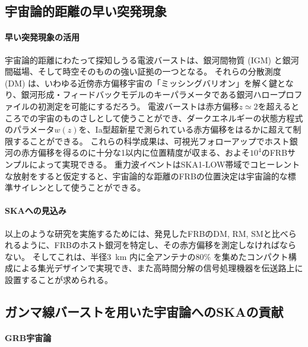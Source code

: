 \subsection{宇宙論的距離の早い突発現象}
\label{c09.s2.ss5}

\paragraph{早い突発現象の活用}

宇宙論的距離にわたって探知しうる電波バーストは、銀河間物質 (IGM) と銀河間磁場、そして時空そのものの強い証拠の一つとなる。
それらの分散測度 (DM) は、いわゆる近傍赤方偏移宇宙の「ミッシングバリオン」を解く鍵となり、銀河形成・フィードバックモデルのキーパラメータである銀河ハロープロファイルの初測定を可能にするだろう。
電波バーストは赤方偏移$z\simeq 2$を超えるところでの宇宙のものさしとして使うことができ、ダークエネルギーの状態方程式のパラメータ$w(z)$を、Ia型超新星で測られている赤方偏移をはるかに超えて制限することができる。
これらの科学成果は、可視光フォローアップでホスト銀河の赤方偏移を得るのに十分な1\arcsec 以内に位置精度が収まる、およそ$10^4$のFRBサンプルによって実現できる。
重力波イベントはSKA1-LOW帯域でコヒーレントな放射をすると仮定すると、宇宙論的な距離のFRBの位置決定は宇宙論的な標準サイレンとして使うことができる。

\paragraph{SKAへの見込み}

以上のような研究を実施するためには、発見したFRBのDM, RM, SMと比べられるように、FRBのホスト銀河を特定し、その赤方偏移を測定しなければならない。
そしてこれは、半径3~km 内に全アンテナの80\% を集めたコンパクト構成による集光デザインで実現でき、また高時間分解の信号処理機器を伝送路上に設置することが求められる。

\subsection{ガンマ線バーストを用いた宇宙論へのSKAの貢献}
\label{c09.s2.ss6}

\paragraph{GRB宇宙論}

